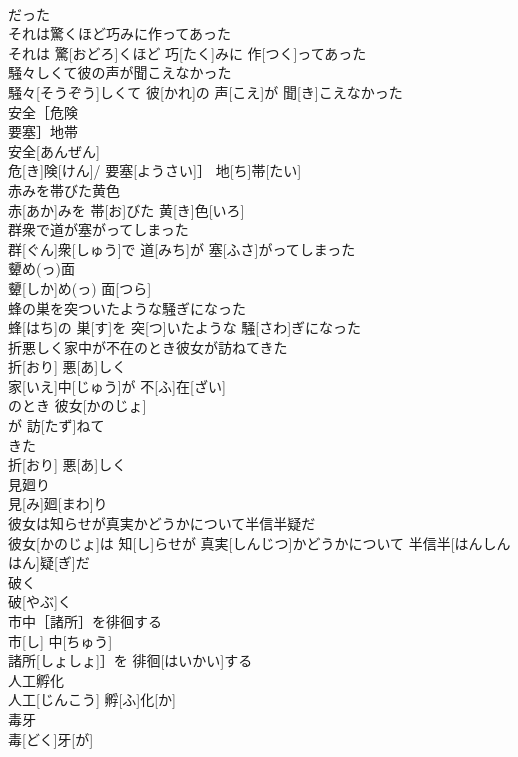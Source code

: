 \documentclass[8pt]{extreport}
\begin{document}
\begin{CJK}{UTF8}{min}
\\	だった
\\	それは驚くほど巧みに作ってあった	
\\	それは 驚[おどろ]くほど 巧[たく]みに 作[つく]ってあった
\\	騒々しくて彼の声が聞こえなかった	
\\	騒々[そうぞう]しくて 彼[かれ]の 声[こえ]が 聞[き]こえなかった
\\	安全［危険 
\\	要塞］地帯	
\\	安全[あんぜん]
\\	危[き]険[けん]/ 要塞[ようさい]］ 地[ち]帯[たい]
\\	赤みを帯びた黄色	
\\	赤[あか]みを 帯[お]びた 黄[き]色[いろ]
\\	群衆で道が塞がってしまった	
\\	群[ぐん]衆[しゅう]で 道[みち]が 塞[ふさ]がってしまった
\\	顰め(っ)面	
\\	顰[しか]め(っ) 面[つら]
\\	蜂の巣を突ついたような騒ぎになった	
\\	蜂[はち]の 巣[す]を 突[つ]いたような 騒[さわ]ぎになった
\\	折悪しく家中が不在のとき彼女が訪ねてきた	
\\	折[おり] 悪[あ]しく 
\\	家[いえ]中[じゅう]が 不[ふ]在[ざい]
\\	のとき 彼女[かのじょ]
\\	が 訪[たず]ねて 
\\	きた 
\\	折[おり] 悪[あ]しく 
\\	見廻り	
\\	見[み]廻[まわ]り
\\	彼女は知らせが真実かどうかについて半信半疑だ	
\\	彼女[かのじょ]は 知[し]らせが 真実[しんじつ]かどうかについて 半信半[はんしんはん]疑[ぎ]だ
\\	破く	
\\	破[やぶ]く
\\	市中［諸所］を徘徊する	
\\	市[し] 中[ちゅう]
\\	諸所[しょしょ]］を 徘徊[はいかい]する
\\	人工孵化	
\\	人工[じんこう] 孵[ふ]化[か]
\\	毒牙	
\\	毒[どく]牙[が]

\end{CJK}
\end{document}
